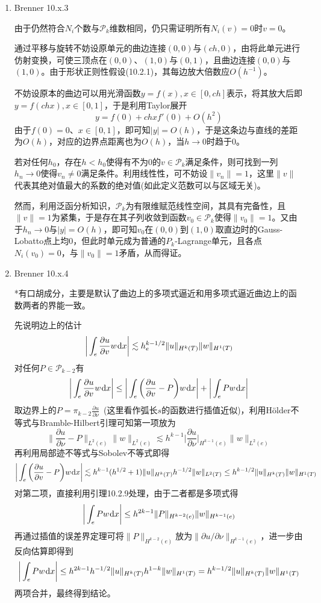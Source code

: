 \documentclass[a4paper,UTF8,fontset=windows,10pt]{ctexart}
\newcommand*{\dr}{\hspace{0.07em}\mathrm{d}}
\begin{document}
\begin{enumerate}
    \item Brenner 10.x.3
    
    由于仍然符合$N_i$个数与$\mathcal{P}_k$维数相同，仍只需证明所有$N_i(v)=0$时$v=0$。
    
    通过平移与旋转不妨设原单元的曲边连接$(0,0)$与$(ch,0)$，由将此单元进行仿射变换，可使三顶点在$(0,0)$、$(1,0)$与$(0,1)$，且曲边连接$(0,0)$与$(1,0)$。由于形状正则性假设(10.2.1)，其每边放大倍数应$O(h^{-1})$。
    
    不妨设原本的曲边可以用光滑函数$y=f(x),x\in[0,ch]$表示，将其放大后即$y=f(chx),x\in[0,1]$，于是利用Taylor展开
    $$y=f(0)+chxf'(0)+O(h^2)$$
    由于$f(0)=0$、$x\in[0,1]$，即可知$|y|=O(h)$，于是这条边与直线的差距为$O(h)$，对应的边界点距离也为$O(h)$，当$h\to0$时趋于0。
    
    若对任何$h_0$，存在$h<h_0$使得有不为0的$v\in\mathcal{P}_k$满足条件，则可找到一列$h_n\to0$使得$v_n\ne 0$满足条件。利用线性性，可不妨设$\|v_n\|=1$，这里$\|v\|$代表其绝对值最大的系数的绝对值(如此定义范数可以与区域无关)。
    
    然而，利用泛函分析知识，$\mathcal{P}_k$为有限维赋范线性空间，其具有完备性，且$\|v\|=1$为紧集，于是存在其子列收敛到函数$v_0\in\mathcal{P}_k$使得$\|v_0\|=1$。又由于$h_n\to0$与$|y|=O(h)$，即可知$v_0$在$(0,0)$到$(1,0)$取直边时的Gauss-Lobatto点上均0，但此时单元成为普通的$P_k$-Lagrange单元，且各点$N_i(v_0)=0$，与$\|v_0\|=1$矛盾，从而得证。
    
    \item Brenner 10.x.4
    
    *有口胡成分，主要是默认了曲边上的多项式逼近和用多项式逼近曲边上的函数两者的界能一致。
    
    先说明边上的估计
    $$\bigg|\int_e\frac{\partial u}{\partial v}w\dr x\bigg|\lesssim h_e^{k-1/2}\|u\|_{H^k(T)}\|w\|_{H^1(T)}$$
    对任何$P\in\mathcal{P}_{k-2}$有
    $$\bigg|\int_e\frac{\partial u}{\partial v}w\dr x\bigg|\le\bigg|\int_e\bigg(\frac{\partial u}{\partial v}-P\bigg)w\dr x\bigg|+\bigg|\int_ePw\dr x\bigg|$$
    取边界上的$P=\pi_{k-2}\frac{\partial u}{\partial\nu}$\ (这里看作弧长$s$的函数进行插值近似)，利用H\"older不等式与Bramble-Hilbert引理可知第一项放为
    $$\bigg\|\frac{\partial u}{\partial\nu}-P\bigg\|_{L^2(e)}\|w\|_{L^2(e)}\lesssim h^{k-1}\bigg|\frac{\partial u}{\partial\nu}\bigg|_{H^{k-1}(e)}\|w\|_{L^2(e)}$$
    再利用局部迹不等式与Sobolev不等式即得
    $$\bigg|\int_e\bigg(\frac{\partial u}{\partial v}-P\bigg)w\dr x\bigg|\lesssim h^{k-1}(h^{1/2}+1)\|u\|_{H^k(T)}h^{-1/2}\|w\|_{L^2(T)}\le h^{k-1/2}\|u\|_{H^k(T)}\|w\|_{H^1(T)}$$
    对第二项，直接利用引理10.2.9处理，由于二者都是多项式得
    $$\bigg|\int_ePw\dr x\bigg|\le h^{2k-1}\|P\|_{H^{k-2}(e)}\|w\|_{H^{k-1}(e)}$$
    再通过插值的误差界定理可将$\|P\|_{H^{k-2}(e)}$放为$\|\partial u/\partial\nu\|_{H^{k-1}(e)}$，进一步由反向估算即得到
    $$\bigg|\int_ePw\dr x\bigg|\le h^{2k-1}h^{-1/2}\|u\|_{H^k(T)}h^{1-k}\|w\|_{H^1(T)}=h^{k-1/2}\|u\|_{H^k(T)}\|w\|_{H^1(T)}$$
    两项合并，最终得到结论。
    

\end{enumerate}
\end{document}
